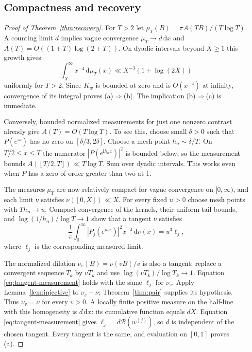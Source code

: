 \documentclass[11pt]{article}
\theoremstyle{definition}\newtheorem{definition}[theorem]{Definition}
\theoremstyle{remark}\newtheorem{remark}[theorem]{Remark}
\newcommand{\dd}{\,\mathrm d}\newcommand{\ii}{\mathrm i}
\newcommand{\B}{\mathcal B}
\begin{document}
\subsection{Compactness and recovery}

\begin{proof}[Proof of Theorem~\ref{thm:recovery}]
For $T>2$ let $\mu_T(B)=\pi A(TB)/(T\log T)$.
A counting limit $d$ implies vague convergence $\mu_T\to d\dd x$ and
$A(T)=O((1+T)\log(2+T))$. On dyadic intervals beyond $X\ge1$ this growth gives
\[
 \int_X^\infty x^{-4}\dd\mu_T(x)
 \ll X^{-3}(1+\log(2X))
\]
uniformly for $T>2$. Since $K_w$ is bounded at zero and is $O(x^{-4})$
at infinity, convergence of its integral proves (a)$\Rightarrow$(b).
The implication (b)$\Rightarrow$(c) is immediate.

Conversely, bounded normalized measurements for just one nonzero contrast
already give $A(T)=O(T\log T)$. To see this, choose small $\delta>0$ such
that $P(e^{\ii x})$ has no zero on $[\delta/3,2\delta]$.
Choose a mesh point $h_n\sim\delta/T$. On $T/2\le x\le T$ the numerator
$|P(e^{\ii h_nx})|^2$ is bounded below, so the measurement bounds
$A([T/2,T])\ll T\log T$. Sum over dyadic intervals.
This works even when $P$ has a zero of order greater than two at $1$.

The measures $\mu_T$ are now relatively compact for vague convergence on
$[0,\infty)$, and each limit $\nu$ satisfies $\nu([0,X])\ll X$.
For every fixed $u>0$ choose mesh points with $Th_n\to u$.
Compact convergence of the kernels, their uniform tail bounds, and
$\log(1/h_n)/\log T\to1$ show that a tangent $\nu$ satisfies
\begin{equation}\label{eq:tangent-measurement}
 \frac1\pi\int_0^\infty|P_j(e^{\ii ux})|^2x^{-4}\dd\nu(x)
 =u^3\ell_j,
\end{equation}
where $\ell_j$ is the corresponding measured limit.

The normalized dilation $\nu_v(B)=\nu(vB)/v$ is also a tangent:
replace a convergent sequence $T_k$ by $vT_k$ and use
$\log(vT_k)/\log T_k\to1$.
Equation \eqref{eq:tangent-measurement} holds with the same $\ell_j$
for $\nu_v$. Apply Lemma~\ref{lem:injective} to $\nu_v-\nu$;
Theorem~\ref{thm:pair} supplies its hypothesis. Thus $\nu_v=\nu$ for
every $v>0$. A locally finite positive measure on the half-line with this
homogeneity is $d\dd x$: its cumulative function equals $dX$.
Equation \eqref{eq:tangent-measurement} gives $\ell_j=d\B(w^{(j)})$,
so $d$ is independent of the chosen tangent. Every tangent is the same,
and evaluation on $[0,1]$ proves (a).


\end{proof}
\end{document}
